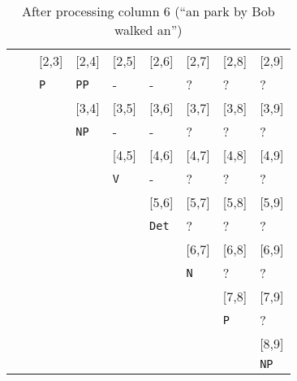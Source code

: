 \documentclass[a4paper]{article}
\begin{document}
\begin{enumerate}
\begin{enumerate}
\begin{enumerate}
\begin{itemize}
\begin{table}[hp]
\begin{tabular}{ccccccccc}
\cline{2-9}
 & & \multicolumn{1}{|l|}{[2,3]} & \multicolumn{1}{l|}{[2,4]} & \multicolumn{1}{l|}{[2,5]} & \multicolumn{1}{l|}{[2,6]} & \multicolumn{1}{l|}{[2,7]} & \multicolumn{1}{l|}{[2,8]} & \multicolumn{1}{l|}{[2,9]} \\
 & & \multicolumn{1}{|l|}{\texttt{P}} & \multicolumn{1}{l|}{\texttt{PP}} & \multicolumn{1}{l|}{-} & \multicolumn{1}{l|}{-} & \multicolumn{1}{l|}{?} & \multicolumn{1}{l|}{?} & \multicolumn{1}{l|}{?} \\
\cline{3-9}
 & & & \multicolumn{1}{|l|}{[3,4]} & \multicolumn{1}{l|}{[3,5]} & \multicolumn{1}{l|}{[3,6]} & \multicolumn{1}{l|}{[3,7]} & \multicolumn{1}{l|}{[3,8]} & \multicolumn{1}{l|}{[3,9]} \\
 & & & \multicolumn{1}{|l|}{\texttt{NP}} & \multicolumn{1}{l|}{-} & \multicolumn{1}{l|}{-} & \multicolumn{1}{l|}{?} & \multicolumn{1}{l|}{?} & \multicolumn{1}{l|}{?} \\
\cline{4-9}
 & & & & \multicolumn{1}{|l|}{[4,5]} & \multicolumn{1}{l|}{[4,6]} & \multicolumn{1}{l|}{[4,7]} & \multicolumn{1}{l|}{[4,8]} & \multicolumn{1}{l|}{[4,9]} \\
 & & & & \multicolumn{1}{|l|}{\texttt{V}} & \multicolumn{1}{l|}{-} & \multicolumn{1}{l|}{?} & \multicolumn{1}{l|}{?} & \multicolumn{1}{l|}{?} \\
\cline{5-9}
 & & & & & \multicolumn{1}{|l|}{[5,6]} & \multicolumn{1}{l|}{[5,7]} & \multicolumn{1}{l|}{[5,8]} & \multicolumn{1}{l|}{[5,9]} \\
 & & & & & \multicolumn{1}{|l|}{\texttt{Det}} & \multicolumn{1}{l|}{?} & \multicolumn{1}{l|}{?} & \multicolumn{1}{l|}{?} \\
\cline{6-9}
 & & & & & & \multicolumn{1}{|l|}{[6,7]} & \multicolumn{1}{l|}{[6,8]} & \multicolumn{1}{l|}{[6,9]} \\
 & & & & & & \multicolumn{1}{|l|}{\texttt{N}} & \multicolumn{1}{l|}{?} & \multicolumn{1}{l|}{?} \\
\cline{7-9}
 & & & & & & & \multicolumn{1}{|l|}{[7,8]} & \multicolumn{1}{l|}{[7,9]} \\
 & & & & & & & \multicolumn{1}{|l|}{\texttt{P}} & \multicolumn{1}{l|}{?} \\
\cline{8-9}
 & & & & & & & & \multicolumn{1}{|l|}{[8,9]} \\
 & & & & & & & & \multicolumn{1}{|l|}{\texttt{NP}} \\
\cline{9-9}
\end{tabular}
\caption{After processing column 6 (``an park by Bob walked an'')}
\end{table}

\end{itemize}
\end{enumerate}
\end{enumerate}
\end{enumerate}
\end{document}

